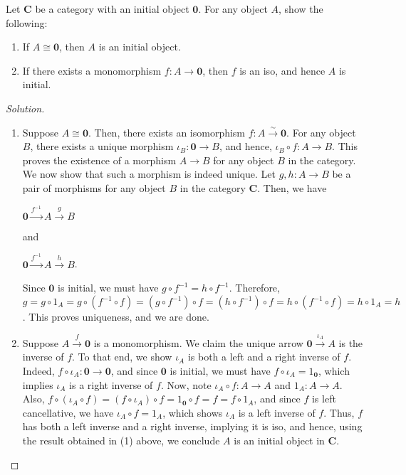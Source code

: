 \documentclass[]{amsbook}
\newcommand{\catname}[1]{\mathbf{#1}}
\newcommand{\0}{\mathbf{0}}
\newcommand{\1}{\mathbf{1}}
\newenvironment{solution}
    {\begin{proof}[Solution]}{\end{proof}}
\begin{document}
\setcounter{Exercise}{21}
\begin{Exercise}
    Let $\catname{C}$ be a category with an initial object $\0$. For any object
    $A$, show the following:
    \begin{enumerate}
        \item If $A \cong \0$, then $A$ is an initial object.
        \item If there exists a monomorphism $f: A \to \0$, then $f$ is an iso,
        and hence $A$ is initial.
    \end{enumerate}
\end{Exercise}
\begin{solution}
    \leavevmode
    \begin{enumerate}
        \item Suppose $A \cong \0$. Then, there exists an isomorphism $f: A
        \xrightarrow{\sim} \0$. For any object $B$, there exists a unique
        morphism $\iota_B: \0 \to B$, and hence, $\iota_B \circ f: A \to B$.
        This proves the existence of a morphism $A \to B$ for any object $B$
        in the category. We now show that such a morphism is indeed unique.
        Let $g, h: A \to B$ be a pair of morphisms for any object $B$ in the
        category $\catname{C}$. Then, we have
        \begin{center}
            $\0 \xrightarrow{f^{-1}} A \xrightarrow{g} B$
        \end{center}
        and
        \begin{center}
            $\0 \xrightarrow{f^{-1}} A \xrightarrow{h} B$.
        \end{center}
        Since $\0$ is initial, we must have $g \circ f^{-1} = h \circ f^{-1}$.
        Therefore, $g = g \circ 1_A = g \circ (f^{-1} \circ f) = (g \circ f^{-1})
        \circ f = (h \circ f^{-1}) \circ f = h \circ (f^{-1} \circ f) = h \circ
        1_A = h$. This proves uniqueness, and we are done.
        \item Suppose $A \xrightarrow{f} \0$ is a monomorphism. We claim
        the unique arrow $\0 \xrightarrow{\iota_A} A$ is the inverse of $f$. To
        that end, we show $\iota_A$ is both a left and a right inverse of $f$.
        Indeed, $f \circ \iota_A : \0 \to \0$, and since $\0$ is initial, we
        must have $f \circ \iota_A = 1_{\0}$, which implies $\iota_A$ is a
        right inverse of $f$. Now, note $\iota_A \circ f: A \to A$ and
        $1_A: A \to A$. Also, $f \circ (\iota_A \circ f) = (f \circ \iota_A)
        \circ f = 1_{\0} \circ f = f = f \circ 1_A$, and since $f$ is left
        cancellative, we have $\iota_A \circ f = 1_A$, which shows $\iota_A$ is
        a left inverse of $f$. Thus, $f$ has both a left inverse and a right
        inverse, implying it is iso, and hence, using the result obtained in (1)
        above, we conclude $A$ is an initial object in $\catname{C}$.
    \end{enumerate}
\end{solution}
\end{document}
